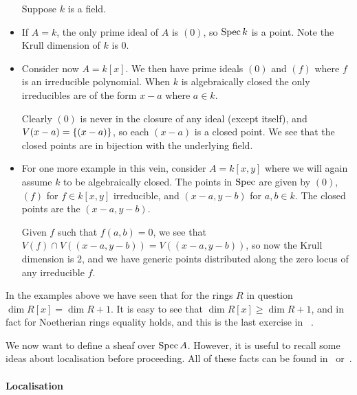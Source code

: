 \documentclass[000-main.tex]{subfiles}
\begin{document}
\begin{example}
  \begin{itemize}
    Suppose $k$ is a field.
    \item If $A = k$, the only prime ideal of $A$ is $(0)$, so $\operatorname{Spec} k$ is a point.
    Note the Krull dimension of $k$ is 0.

    \item Consider now $A = k[x]$.
    We then have prime ideals $(0)$ and $(f)$ where $f$ is an irreducible polynomial.
    When $k$ is algebraically closed the only irreducibles are of the form $x-a$ where $a \in k$.

    Clearly $(0)$ is never in the closure of any ideal (except itself), and $V(x-a) = \qty{(x-a)}$, so each $(x-a)$ is a closed point. %
    We see that the closed points are in bijection with the underlying field.

    \item For one more example in this vein, consider $A = k[x, y]$ where we will again assume $k$ to be algebraically closed.
    The points in $\operatorname{Spec}$ are given by $(0)$, $(f)$ for $f \in k[x, y]$ irreducible, and $(x-a, y-b)$ for $a,b \in k$.
    The closed points are the $(x-a, y-b)$.

    Given $f$ such that $f(a,b)=0$, we see that $V(f) \cap V((x-a, y-b)) = V((x-a, y-b))$, so now the Krull dimension is 2, and we have generic points distributed along the zero locus of any irreducible $f$.
  \end{itemize}
\end{example}

\begin{remark}
  In the examples above we have seen that for the rings $R$ in question $\dim R[x] = \dim R + 1$.
  It is easy to see that $\dim R[x] \geq \dim R + 1$, and in fact for Noetherian rings equality holds, and this is the last exercise in \citeauthor{atiyahIntroductionCommutativeAlgebra2000}~\cite{atiyahIntroductionCommutativeAlgebra2000}.
\end{remark}

We now want to define a sheaf over $\operatorname{Spec} A$.
However, it is useful to recall some ideas about localisation before proceeding.
All of these facts can be found in~\cite[][81-86]{altmanTermCommutativeAlgebra2013} or~\cite[][36-49]{atiyahIntroductionCommutativeAlgebra2000}.

\paragraph{Localisation}
\end{document}
